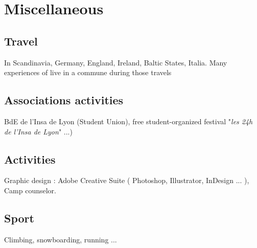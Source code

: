 \section{Miscellaneous}
	\subsection{Travel}
		{In Scandinavia, Germany, England, Ireland, Baltic States, Italia. Many experiences of live in a commune during those travels}
		
	\subsection{Associations activities}
		{BdE de l'Insa de Lyon (Student Union), free student-organized festival "\textit{les 24h de l'Insa de Lyon}" ...)}
		
	\subsection{Activities}
		{Graphic design : Adobe Creative Suite ( Photoshop, Illustrator, InDesign ... ),\\Camp counselor.}
		
	\subsection{Sport}
		{Climbing, snowboarding, running ...}
		

